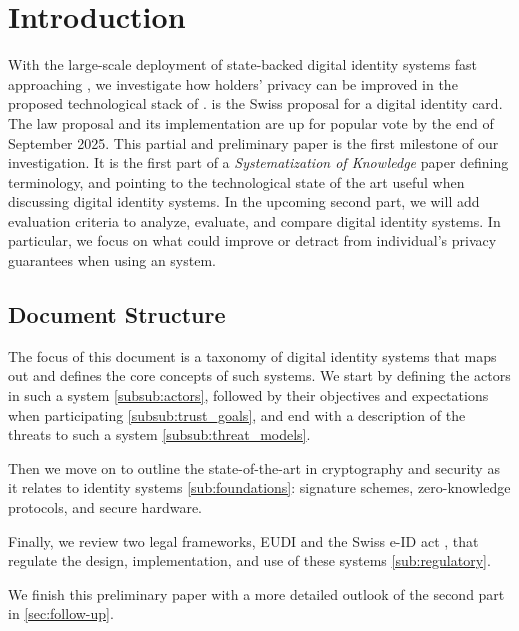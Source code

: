 \section{Introduction}

With the large-scale deployment of state-backed digital identity systems fast approaching \cite{Swiyu} \cite{EUDI-ARF}, we investigate how holders' privacy can be improved in the proposed technological stack of \swiyu.
\swiyu is the Swiss proposal for a digital identity card.
The law proposal and its implementation are up for popular vote by the end of September 2025.
This partial and preliminary paper is the first milestone of our investigation. 
It is the first part of a \emph{Systematization of Knowledge} paper defining terminology, and pointing to the technological state of the art useful when discussing digital identity systems.
In the upcoming second part, we will add evaluation criteria to analyze, evaluate, and compare digital identity systems.
In particular, we focus on what could improve or detract from individual's privacy guarantees when using an \eid system.

\subsection{Document Structure}

The focus of this document is a taxonomy of digital identity systems that maps out and defines the core concepts of such systems.
We start by defining the actors in such a system \ref{subsub:actors}, followed by their objectives and expectations when participating \ref{subsub:trust_goals}, and end with a description of the threats to such a system \ref{subsub:threat_models}.

Then we move on to outline the state-of-the-art in cryptography and security as it relates to identity systems \ref{sub:foundations}: signature schemes, zero-knowledge protocols, and secure hardware.

Finally, we review two legal frameworks, EUDI \cite{EUDI} and the Swiss e-ID act \cite{SwiyuAct25}, that regulate the design, implementation, and use of these systems \ref{sub:regulatory}.

We finish this preliminary paper with a more detailed outlook of the second part in \ref{sec:follow-up}.